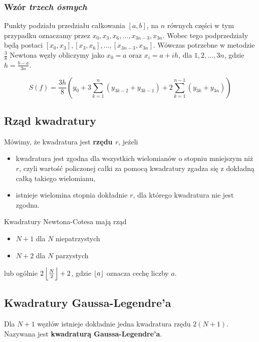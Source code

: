 \documentclass[../mn-notatki.tex]{subfiles}
\begin{document}
\subsubsection{Wzór \textit{trzech ósmych}}

Punkty podziału przedziału całkowania
$[a,b]$,
na $n$ równych części w tym przypadku
oznaczamy przez $x_0, x_3, x_6, \ldots, x_{3n-3}, x_{3n}$.
Wobec tego podprzedziały będą postaci
$[x_0, x_3], [x_3, x_6], \ldots, [x_{3n-3}, x_{3n}]$.
Wówczas potrzebne w metodzie $\frac{3}{8}$ Newtona węzły obliczymy jako
$x_0 = a$ oraz $x_i = a + ih$, dla $1, 2, \ldots, 3n$, gdzie
$h = \frac{b-a}{3n}$.

\begin{tcolorbox}
\[
S(f) = \frac{3h}{8}
\left(
y_0
+ 3 \sum_{k=1}^n (y_{3k-2} + y_{3k-1})
+ 2 \sum_{k=1}^{n-1} (y_{3k} + y_{3n})
\right)
\]
\end{tcolorbox}


\subsection{Rząd kwadratury}

\begin{tcolorbox}
Mówimy, że kwadratura jest \textbf{rzędu $r$}, jeżeli
\begin{itemize}
    \item kwadratura jest zgodna dla wszystkich wielomianów o stopniu mniejszym
    niż $r$, czyli wartość policzonej całki za pomocą kwadratury zgadza się
    z dokładną całką takiego wielomianu,
    \item istnieje wielomina stopnia dokładnie $r$, dla którego kwadratura nie
    jest zgodna.
\end{itemize}
\end{tcolorbox}

Kwadratury Newtona-Cotesa mają rząd
\begin{itemize}
    \item $N+1$ dla $N$ niepatrzystych
    \item $N+2$ dla $N$ parzystych
\end{itemize}
lub ogólnie $2 \left \lfloor \frac{N}{2} \right \rfloor + 2$, gdzie $\left \lfloor a \right \rfloor$ oznacza cechę liczby
$a$.

\subsection{Kwadratury Gaussa-Legendre'a}

\begin{tcolorbox}
Dla $N+1$ węzłów istnieje dokładnie jedna kwadratura rzędu $2(N+1)$.
Nazywana jest \textbf{kwadraturą Gaussa-Legendre'a}.
\end{tcolorbox}
\end{document}
